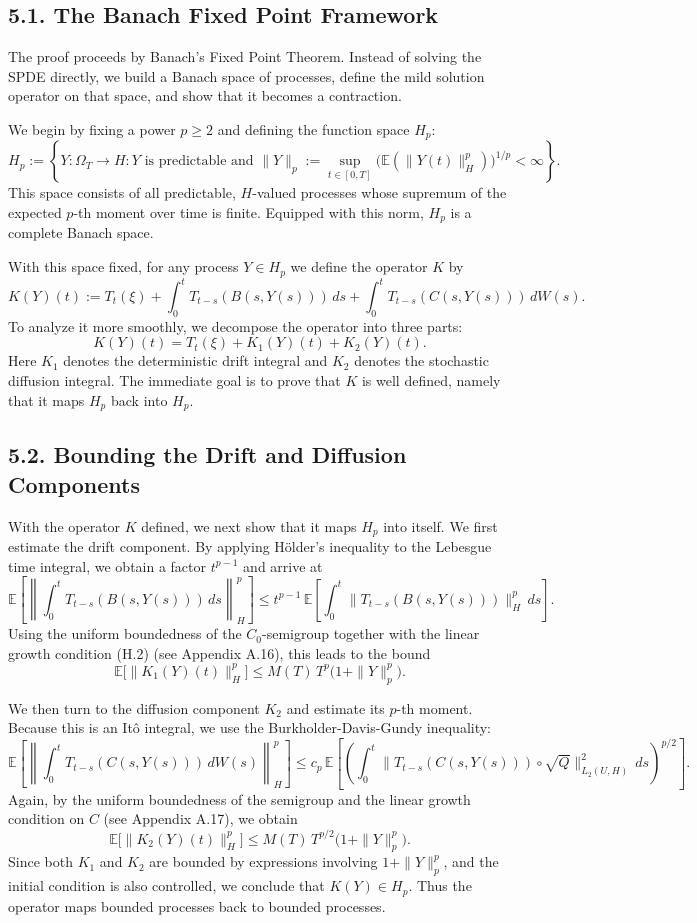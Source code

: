 \documentclass[11pt]{article}
\theoremstyle{definition}
\theoremstyle{remark}
\begin{document}
\subsection*{5.1. The Banach Fixed Point Framework}
The proof proceeds by Banach's Fixed Point Theorem. Instead of solving the SPDE directly, we build a Banach space of processes, define the mild solution operator on that space, and show that it becomes a contraction.

We begin by fixing a power \(p\ge 2\) and defining the function space \(H_p\):
\[
H_p
:=
\left\{
Y:\Omega_T\to H:
Y \text{ is predictable and }
\|Y\|_p:=\sup_{t\in[0,T]}\bigl(\mathbb E(\|Y(t)\|_H^p)\bigr)^{1/p}<\infty
\right\}.
\]
This space consists of all predictable, \(H\)-valued processes whose supremum of the expected \(p\)-th moment over time is finite. Equipped with this norm, \(H_p\) is a complete Banach space.

With this space fixed, for any process \(Y\in H_p\) we define the operator \(K\) by
\[
K(Y)(t)
:=
T_t(\xi)+\int_0^t T_{t-s}(B(s,Y(s)))\,ds+\int_0^t T_{t-s}(C(s,Y(s)))\,dW(s).
\]
To analyze it more smoothly, we decompose the operator into three parts:
\[
K(Y)(t)=T_t(\xi)+K_1(Y)(t)+K_2(Y)(t).
\]
Here \(K_1\) denotes the deterministic drift integral and \(K_2\) denotes the stochastic diffusion integral. The immediate goal is to prove that \(K\) is well defined, namely that it maps \(H_p\) back into \(H_p\).

\subsection*{5.2. Bounding the Drift and Diffusion Components}
With the operator \(K\) defined, we next show that it maps \(H_p\) into itself. We first estimate the drift component.
By applying H\"older's inequality to the Lebesgue time integral, we obtain a factor \(t^{p-1}\) and arrive at
\[
\mathbb E\left[\left\|\int_0^t T_{t-s}(B(s,Y(s)))\,ds\right\|_H^p\right]
\le
t^{p-1}\,
\mathbb E\left[\int_0^t \|T_{t-s}(B(s,Y(s)))\|_H^p\,ds\right].
\]
Using the uniform boundedness of the \(C_0\)-semigroup together with the linear growth condition \textnormal{(H.2)} (see Appendix A.16), this leads to the bound
\[
\mathbb E\bigl[\|K_1(Y)(t)\|_H^p\bigr]
\le
M(T)\,T^p\bigl(1+\|Y\|_p^p\bigr).
\]

We then turn to the diffusion component \(K_2\) and estimate its \(p\)-th moment.
Because this is an It\^o integral, we use the Burkholder-Davis-Gundy inequality:
\[
\mathbb E\left[\left\|\int_0^t T_{t-s}(C(s,Y(s)))\,dW(s)\right\|_H^p\right]
\le
c_p\,\mathbb E\left[\left(\int_0^t \|T_{t-s}(C(s,Y(s)))\circ \sqrt Q\|_{L_2(U,H)}^2\,ds\right)^{p/2}\right].
\]
Again, by the uniform boundedness of the semigroup and the linear growth condition on \(C\) (see Appendix A.17), we obtain
\[
\mathbb E\bigl[\|K_2(Y)(t)\|_H^p\bigr]
\le
M(T)\,T^{p/2}\bigl(1+\|Y\|_p^p\bigr).
\]
Since both \(K_1\) and \(K_2\) are bounded by expressions involving \(1+\|Y\|_p^p\), and the initial condition is also controlled, we conclude that \(K(Y)\in H_p\). Thus the operator maps bounded processes back to bounded processes.
\end{document}
